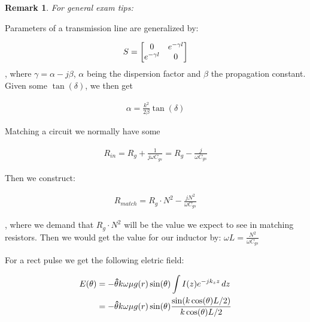 \documentclass[11pt,landscape]{article}
\newtheorem{remark}[definition]{Remark}
\begin{document}
\begin{multicols}{3}
\begin{remark}
    For general exam tips:
\end{remark}

Parameters of a transmission line are generalized by:

\begin{align*}
    S=\mqty[0 & e^{-\gamma l}\\ e^{-\gamma l} & 0]
\end{align*}
, where $\gamma=\alpha-j\beta$, $\alpha$ being the dispersion factor and $\beta$ the propagation constant. Given some $\tan(\delta)$, we then get

\begin{align*}
    \alpha=\frac{k^2}{2\beta}\tan(\delta)
\end{align*}

Matching a circuit we normally have some

\begin{align*}
    R_{in}=R_g+\frac{1}{j\omega C_{gs}}=R_g-\frac{j}{\omega C_{gs}}
\end{align*}

Then we construct:

\begin{align*}
    R_{match} = R_g\cdot N^2-\frac{jN^2}{\omega C_{gs}}
\end{align*}

, where we demand that $R_g\cdot N^2$ will be the value we expect to see in matching resistors. Then we would get the value for our inductor by: $\omega L=\frac{N^2}{\omega C_{gs}}$

\vspace{1em}
For a rect pulse we get the following eletric field:

\begin{align*}
    E(\theta)&=
    -\vu{\theta}k\omega\mu g(r)\sin(\theta)\int I(z)e^{-jk_zz}\,dz
    \\&=-\vu{\theta}k\omega\mu g(r)\sin(\theta)\frac{\sin(k\cos(\theta)L/2)}{k\cos(\theta)L/2}
\end{align*}


\end{multicols}
\end{document}
